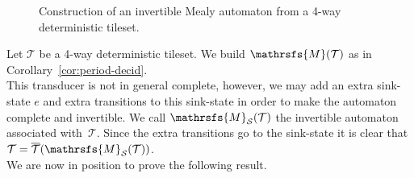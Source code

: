 \documentclass{amsart}
\begin{document}
{\begin{figure}[h]
\caption{Construction of an invertible  Mealy automaton from a 4-way deterministic tileset.}
\label{fig-4way}
\end{figure}

Let $\mathcal{T}$  be a 4-way deterministic tileset. We build ${{{\mathrsfs{{M}}}}}(\mathcal{T})$ as in Corollary~\ref{cor:period-decid}.\\
This transducer is not in general complete, however, we may add an extra sink-state $e$ and extra transitions to this sink-state in order to make the automaton complete and invertible. We call ${{{\mathrsfs{{M}}}}}_{\mathcal{S}}(\mathcal{T}) $ the invertible automaton associated with~$\mathcal{T}$. Since the extra transitions go to the sink-state it is clear that $\mathcal{T}=\overline{\mathcal{T}}({{{\mathrsfs{{M}}}}}_{\mathcal{S}}(\mathcal{T}))$.\\
We are now in position to prove the following result.

}
\end{document}
